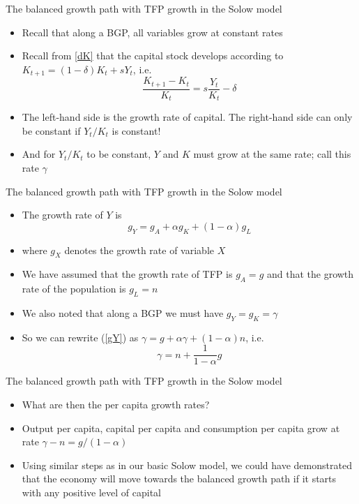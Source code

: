 \documentclass[10pt]{beamer}
\begin{document}
\begin{frame}{The balanced growth path with TFP growth in the Solow model}
\begin{itemize}
    \item Recall that along a BGP, all variables grow at constant rates \medskip
    \item Recall from \eqref{dK} that the capital stock develops according to $K_{t+1}=(1-\delta)K_t+sY_t$, i.e.
        \[ \frac{K_{t+1}-K_t}{K_t} = s \frac{Y_t}{K_t} - \delta \] \smallskip
    \item The left-hand side is the growth rate of capital. The right-hand side can only be constant if $Y_t/K_t$ is constant! \medskip
    \item And for $Y_t/K_t$ to be constant, $Y$ and $K$ must grow at the same rate; call this rate $\gamma$
\end{itemize}
\end{frame}


\begin{frame}{The balanced growth path with TFP growth in the Solow model}
\begin{itemize}
    \item The growth rate of $Y$ is
        \begin{equation}\label{gY}
            g_Y = g_A + \alpha g_K + (1-\alpha)g_L
        \end{equation}
    \item[] where $g_X$ denotes the growth rate of variable $X$ \medskip
    \item We have assumed that the growth rate of TFP is $g_A = g$ and that the growth rate of the population is $g_L=n$ \medskip
    \item We also noted that along a BGP we must have $ g_Y=g_K=\gamma $ \medskip
    \item So we can rewrite (\ref{gY}) as $\gamma = g + \alpha \gamma + (1-\alpha) n$, i.e.        
        \[ \gamma = n + \frac{1}{1-\alpha}g \]
\end{itemize}
\end{frame}


\begin{frame}{The balanced growth path with TFP growth in the Solow model}
\begin{itemize}
    \item What are then the per capita growth rates? \medskip
    \item Output per capita, capital per capita and consumption per capita grow at rate $\gamma-n=g/(1-\alpha)$ \medskip
    \item Using similar steps as in our basic Solow model, we could have demonstrated that the economy will move towards the balanced growth path if it starts with any positive level of capital
\end{itemize}
\end{frame}
\end{document}
